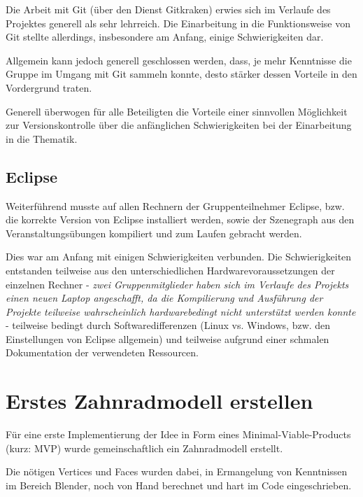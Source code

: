 \documentclass{article}
\begin{document}
Die Arbeit mit Git (über den Dienst Gitkraken) erwies sich im Verlaufe des Projektes generell als sehr lehrreich. 
Die Einarbeitung in die Funktionsweise von Git stellte allerdings, insbesondere am Anfang, einige Schwierigkeiten dar. 

Allgemein kann jedoch generell geschlossen werden, dass, je mehr Kenntnisse die Gruppe im Umgang mit Git sammeln konnte, desto stärker dessen Vorteile in den Vordergrund traten.  

Generell überwogen für alle Beteiligten die Vorteile einer sinnvollen Möglichkeit zur Versionskontrolle über die anfänglichen Schwierigkeiten bei der Einarbeitung in die Thematik.


\subsection{Eclipse}
Weiterführend musste auf allen Rechnern der Gruppenteilnehmer Eclipse, bzw. die korrekte Version von Eclipse installiert werden, sowie der Szenegraph aus den Veranstaltungsübungen kompiliert und zum Laufen gebracht werden. \label{EclipseProbleme}

Dies war am Anfang mit einigen Schwierigkeiten verbunden. 
Die Schwierigkeiten entstanden teilweise aus den unterschiedlichen Hardwarevoraussetzungen der einzelnen Rechner - \textit{zwei Gruppenmitglieder haben sich im Verlaufe des Projekts einen neuen Laptop angeschafft, da die Kompilierung und Ausführung der Projekte teilweise wahrscheinlich hardwarebedingt nicht unterstützt werden konnte} - teilweise bedingt durch Softwaredifferenzen (Linux vs. Windows, bzw. den Einstellungen von Eclipse allgemein) und teilweise aufgrund einer schmalen Dokumentation der verwendeten Ressourcen. 



\section{Erstes Zahnradmodell erstellen}
Für eine erste Implementierung der Idee in Form eines Minimal-Viable-Products (kurz: MVP) wurde gemeinschaftlich ein Zahnradmodell erstellt. 

Die nötigen Vertices und Faces wurden dabei, in Ermangelung von Kenntnissen im Bereich Blender, noch von Hand berechnet und hart im Code eingeschrieben. 
\end{document}
